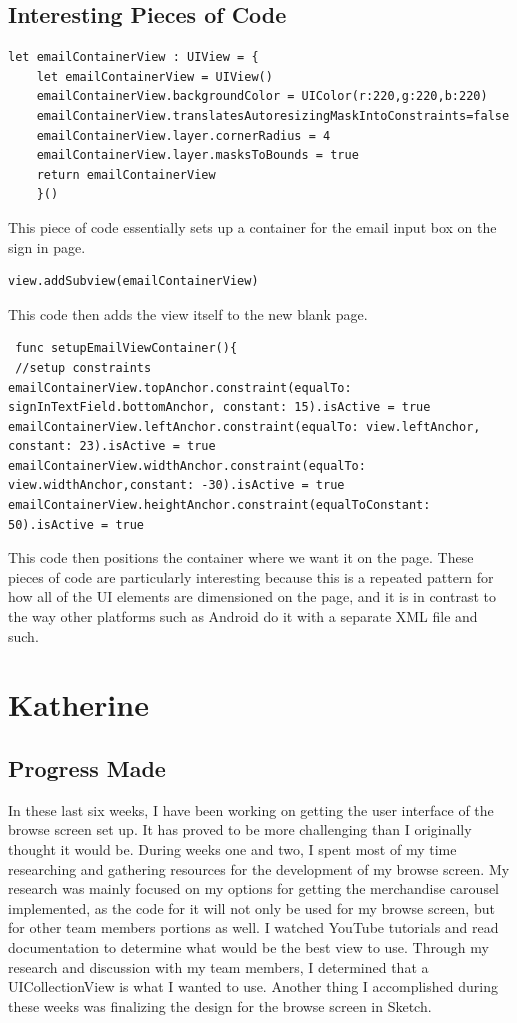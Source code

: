 \documentclass[onecolumn, draftclsnofoot,10pt, compsoc]{IEEEtran}
\begin{document}
\subsection{Interesting Pieces of Code}
\begin{lstlisting}
let emailContainerView : UIView = {
    let emailContainerView = UIView()
    emailContainerView.backgroundColor = UIColor(r:220,g:220,b:220)
    emailContainerView.translatesAutoresizingMaskIntoConstraints=false
    emailContainerView.layer.cornerRadius = 4
    emailContainerView.layer.masksToBounds = true
    return emailContainerView
    }()
\end{lstlisting}
\par This piece of code essentially sets up a container for the email input box on the sign in page. 
\begin{lstlisting}
view.addSubview(emailContainerView)
\end{lstlisting}
\par This code then adds the view itself to the new blank page.
\begin{lstlisting}
 func setupEmailViewContainer(){
 //setup constraints
emailContainerView.topAnchor.constraint(equalTo: signInTextField.bottomAnchor, constant: 15).isActive = true
emailContainerView.leftAnchor.constraint(equalTo: view.leftAnchor, constant: 23).isActive = true
emailContainerView.widthAnchor.constraint(equalTo: view.widthAnchor,constant: -30).isActive = true
emailContainerView.heightAnchor.constraint(equalToConstant: 50).isActive = true
\end{lstlisting}
\par This code then positions the container where we want it on the page. These pieces of code are particularly interesting because this is a repeated pattern for how all of the UI elements are dimensioned on the page, and it is in contrast to the way other platforms such as Android do it with a separate XML file and such.

\section{Katherine}
\subsection{Progress Made}
In these last six weeks, I have been working on getting the user interface of the browse screen set up. It has proved to be more challenging than I originally thought it would be. During weeks one and two, I spent most of my time researching and gathering resources for the development of my browse screen. My research was mainly focused on my options for getting the merchandise carousel implemented, as the code for it will not only be used for my browse screen, but for other team members portions as well. I watched YouTube tutorials and read documentation to determine what would be the best view to use. Through my research and discussion with my team members, I determined that a UICollectionView is what I wanted to use. Another thing I accomplished during these weeks was finalizing the design for the browse screen in Sketch.
\end{document}
